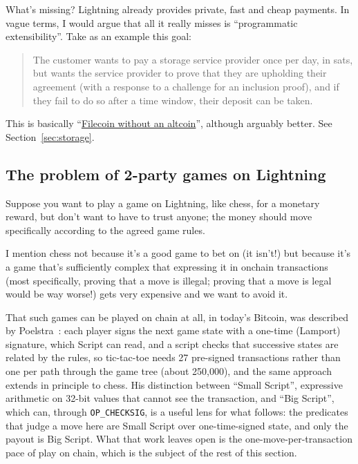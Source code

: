 \documentclass[11pt]{article}
\begin{document}
What's missing? Lightning already provides private, fast and cheap payments. In vague terms, I would argue that all it really misses is ``programmatic extensibility''. Take as an example this goal:

\begin{quote}
The customer wants to pay a storage service provider once per day, in sats, but wants the service provider to prove that they are upholding their agreement (with a response to a challenge for an inclusion proof), and if they fail to do so after a time window, their deposit can be taken.
\end{quote}

This is basically ``\underline{Filecoin without an altcoin}'', although arguably better. See Section~\ref{sec:storage}.

\subsection{The problem of 2-party games on Lightning}

Suppose you want to play a game on Lightning, like chess, for a monetary reward, but don't want to have to trust anyone; the money should move specifically according to the agreed game rules.

I mention chess not because it's a good game to bet on (it isn't!) but because it's a game that's sufficiently complex that expressing it in onchain transactions (most specifically, proving that a move is illegal; proving that a move is legal would be way worse!) gets very expensive and we want to avoid it.

That such games can be played on chain at all, in today's Bitcoin, was described by Poelstra~\cite{poelstrastate}: each player signs the next game state with a one-time (Lamport) signature, which Script can read, and a script checks that successive states are related by the rules, so tic-tac-toe needs 27 pre-signed transactions rather than one per path through the game tree (about 250,000), and the same approach extends in principle to chess. His distinction between ``Small Script'', expressive arithmetic on 32-bit values that cannot see the transaction, and ``Big Script'', which can, through \texttt{OP\_CHECKSIG}, is a useful lens for what follows: the predicates that judge a move here are Small Script over one-time-signed state, and only the payout is Big Script. What that work leaves open is the one-move-per-transaction pace of play on chain, which is the subject of the rest of this section.
\end{document}
